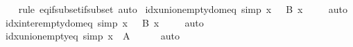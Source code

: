 \begin{isabellebody}
%
\isadelimproof
\ \ %
\endisadelimproof
%
\isatagproof
{}\isamarkupfalse%
\ {\isacharparenleft}{\kern0pt}rule\ eq{\isacharunderscore}{\kern0pt}if{\isacharunderscore}{\kern0pt}subset{\isacharunderscore}{\kern0pt}if{\isacharunderscore}{\kern0pt}subset{\isacharparenright}{\kern0pt}\ auto%
\endisatagproof
{\isafoldproof}%
%
\isadelimproof
\isanewline
%
\endisadelimproof
\isanewline
{}\isamarkupfalse%
\ idx{\isacharunderscore}{\kern0pt}union{\isacharunderscore}{\kern0pt}empty{\isacharunderscore}{\kern0pt}dom{\isacharunderscore}{\kern0pt}eq\ {\isacharbrackleft}{\kern0pt}simp{\isacharbrackright}{\kern0pt}{\isacharcolon}{\kern0pt}\ {\isachardoublequoteopen}{\isacharparenleft}{\kern0pt}{\isasymUnion}x\ {\isasymin}\ {\isacharbraceleft}{\kern0pt}{\isacharbraceright}{\kern0pt}{\isachardot}{\kern0pt}\ B\ x{\isacharparenright}{\kern0pt}\ {\isacharequal}{\kern0pt}\ {\isacharbraceleft}{\kern0pt}{\isacharbraceright}{\kern0pt}{\isachardoublequoteclose}%
\isadelimproof
\ %
\endisadelimproof
%
\isatagproof
{}\isamarkupfalse%
\ auto%
\endisatagproof
{\isafoldproof}%
%
\isadelimproof
%
\endisadelimproof
\isanewline
\isanewline
{}\isamarkupfalse%
\ idx{\isacharunderscore}{\kern0pt}inter{\isacharunderscore}{\kern0pt}empty{\isacharunderscore}{\kern0pt}dom{\isacharunderscore}{\kern0pt}eq\ {\isacharbrackleft}{\kern0pt}simp{\isacharbrackright}{\kern0pt}{\isacharcolon}{\kern0pt}\ {\isachardoublequoteopen}{\isacharparenleft}{\kern0pt}{\isasymInter}x\ {\isasymin}\ {\isacharbraceleft}{\kern0pt}{\isacharbraceright}{\kern0pt}{\isachardot}{\kern0pt}\ B\ x{\isacharparenright}{\kern0pt}\ {\isacharequal}{\kern0pt}\ {\isacharbraceleft}{\kern0pt}{\isacharbraceright}{\kern0pt}{\isachardoublequoteclose}%
\isadelimproof
\ %
\endisadelimproof
%
\isatagproof
{}\isamarkupfalse%
\ auto%
\endisatagproof
{\isafoldproof}%
%
\isadelimproof
%
\endisadelimproof
\isanewline
\isanewline
{}\isamarkupfalse%
\ idx{\isacharunderscore}{\kern0pt}union{\isacharunderscore}{\kern0pt}empty{\isacharunderscore}{\kern0pt}eq\ {\isacharbrackleft}{\kern0pt}simp{\isacharbrackright}{\kern0pt}{\isacharcolon}{\kern0pt}\ {\isachardoublequoteopen}{\isacharparenleft}{\kern0pt}{\isasymUnion}x\ {\isasymin}\ A{\isachardot}{\kern0pt}\ {\isacharbraceleft}{\kern0pt}{\isacharbraceright}{\kern0pt}{\isacharparenright}{\kern0pt}\ {\isacharequal}{\kern0pt}\ {\isacharbraceleft}{\kern0pt}{\isacharbraceright}{\kern0pt}{\isachardoublequoteclose}%
\isadelimproof
\ %
\endisadelimproof
%
\isatagproof
{}\isamarkupfalse%
\ auto%
\endisatagproof
{\isafoldproof}%

\end{isabellebody}
